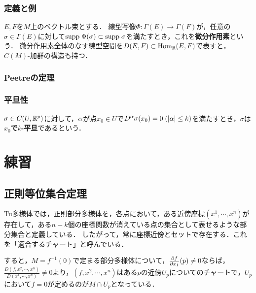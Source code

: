 \documentclass[uplatex,dvipdfmx]{jsreport}
\begin{document}
\subsection{定義と例}

\begin{definition}
    $E,F$を$M$上のベクトル束とする．
    線型写像$\Phi:\Gamma(E)\to\Gamma(F)$が，任意の$\sigma\in\Gamma(E)$に対して$\mathrm{supp}\;\Phi(\sigma)\subset\mathrm{supp}\;\sigma$を満たすとき，これを\textbf{微分作用素}という．
    微分作用素全体のなす線型空間を$D(E,F)\subset\mathrm{Hom}_{\mathbb{R}}(E,F)$で表すと，$C(M)$-加群の構造も持つ．
\end{definition}

\subsection{Peetreの定理}

\subsection{平旦性}

\begin{definition}
    $\sigma\in C(U,\mathbb{R}^p)$に対して，$\alpha$が点$x_0\in U$で$D^\alpha\sigma(x_0)=0\;(\lvert\alpha\rvert\le k)$を満たすとき，$\sigma$は\textbf{$x_0$で$k$-平旦}であるという．
\end{definition}

\chapter{練習}

\section{正則等位集合定理}

\begin{tcolorbox}[colframe=ForestGreen, colback=ForestGreen!10!white,breakable,colbacktitle=ForestGreen!40!white,coltitle=black,fonttitle=\bfseries\sffamily,
title=]
    Tu多様体では，正則部分多様体を，各点において，ある近傍座標$(x^1,\cdots,x^n)$が存在して，ある$n-k$個の座標関数が消えている点の集合として表せるような部分集合と定義している．
    したがって，常に座標近傍とセットで存在する．これを「適合するチャート」と呼んでいる．

    すると，$M=f^{-1}(0)$で定まる部分多様体について，$\frac{\partial f}{\partial x_1}(p)\ne 0$ならば，$\frac{D(f,x^2,\cdots,x^n)}{D(x^1,\cdots,x^n)}\ne 0$より，$(f,x^2,\cdots,x^n)$はある$p$の近傍$U_p$についてのチャートで，$U_p$において$f=0$が定めるのが$M\cap U_p$となっている．
\end{tcolorbox}
\end{document}
